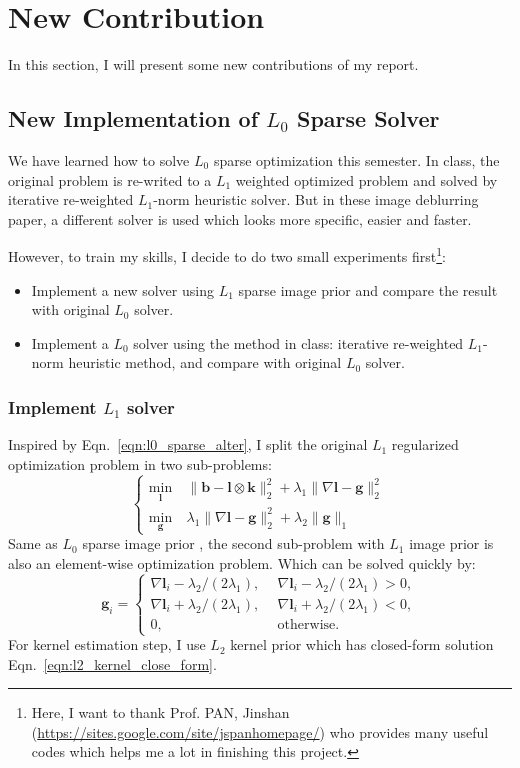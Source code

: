 \documentclass[journal, onecolumn, 10pt]{IEEEtran}
\begin{document}
\section{New Contribution}
In this section, I will present some new contributions of my report. 

\subsection{New Implementation of $L_0$ Sparse Solver}
We have learned how to solve $L_0$ sparse optimization this semester. In class, the original problem is re-writed to a $L_1$ weighted optimized problem and solved by iterative re-weighted $L_1$-norm heuristic solver. But in these image deblurring paper, a different solver is used which looks more specific, easier and faster.

However, to train my skills, I decide to do two small experiments first\footnote{Here, I want to thank Prof. PAN, Jinshan (\url{https://sites.google.com/site/jspanhomepage/}) who provides many useful codes which helps me a lot in finishing this project. }:
\begin{itemize}
\item Implement a new solver using $L_1$ sparse image prior and compare the result with original $L_0$ solver. 
\item Implement a $L_0$ solver using the method in class: iterative re-weighted $L_1$-norm heuristic method, and compare with original $L_0$ solver. 
\end{itemize}

\subsubsection{Implement $L_1$ solver} Inspired by Eqn.~\ref{eqn:l0_sparse_alter}, I split the original $L_1$ regularized optimization problem in two sub-problems:
\begin{equation}
\begin{cases}
\min_{\mathbf{l}} ~&\| \mathbf{b} - \mathbf{l} \otimes \mathbf{k} \|_2^2 + \lambda_1 \|\nabla \mathbf{l} - \mathbf{g}\|_2^2 \\
\min_{\mathbf{g}}~& \lambda_1\|\nabla \mathbf{l} - \mathbf{g}\|_2^2 + \lambda_2\|\mathbf{g}\|_{1} 
\end{cases}
\label{eqn:our_l1_alter}
\end{equation}
Same as $L_0$ sparse image prior \cite{xu2013unnatural}\cite{pan2014deblurring}, the second sub-problem with $L_1$ image prior is also an element-wise optimization problem. Which can be solved quickly by:
\begin{equation}
\mathbf{g}_i = 
\begin{cases}
\nabla\mathbf{l}_i - \lambda_2 / (2\lambda_1), &~~ \nabla\mathbf{l}_i - \lambda_2 / (2\lambda_1) > 0, \\
\nabla\mathbf{l}_i + \lambda_2 / (2\lambda_1), &~~ \nabla\mathbf{l}_i + \lambda_2 / (2\lambda_1) < 0, \\
0, &~~ \text{otherwise}.
\end{cases}
\end{equation}
For kernel estimation step, I use $L_2$ kernel prior which has closed-form solution Eqn.~\ref{eqn:l2_kernel_close_form}.
\end{document}
